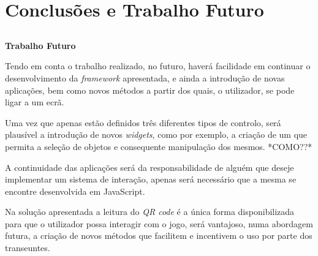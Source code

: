 \chapter{Conclusões e Trabalho Futuro} \label{chap:concl}

\section*{}

\textbf{Trabalho Futuro}

Tendo em conta o trabalho realizado, no futuro, haverá facilidade em continuar o desenvolvimento da \textit{framework} apresentada, e ainda a introdução de novas aplicações, bem como novos métodos a partir dos quais, o utilizador, se pode ligar a um ecrã.

Uma vez que apenas estão definidos três diferentes tipos de controlo, será plausível a introdução de novos \textit{widgets}, como por exemplo, a criação de um que permita a seleção de objetos e consequente manipulação dos mesmos. *COMO??*

A continuidade das aplicações será da responsabilidade de alguém que deseje implementar um sistema de interação, apenas será necessário que a mesma se encontre desenvolvida em JavaScript.

Na solução apresentada a leitura do \textit{QR code} é a única forma disponibilizada para que o utilizador possa interagir com o jogo, será vantajoso, numa abordagem futura, a criação de novos métodos que facilitem e incentivem o uso por parte dos transeuntes.



